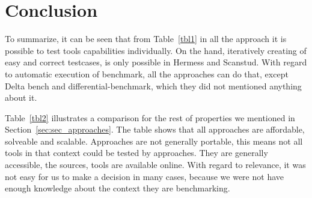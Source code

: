 \documentclass[authoryear,preprint]{sigplanconf}
\begin{document}
\section{Conclusion}
\label{sec:conclusion}
To summarize, it can be seen that from Table~\ref{tbl1} in all the approach it is possible to test tools capabilities individually. On the hand, iteratively creating of easy and correct testcases, is only possible in Hermess and Scanstud. With regard to automatic execution of benchmark, all the approaches can do that, except Delta bench and differential-benchmark, which they did not mentioned anything about it. 

Table~\ref{tbl2} illustrates a comparison for the rest of properties we mentioned in Section~\ref{sec:sec_approaches}. The table shows that all approaches are affordable, solveable and scalable. Approaches are not generally portable, this means not all tools in that context could be tested by approaches. They are generally accessible, the sources, tools are available online. With regard to relevance, it was not easy for us to make a decision in many cases, because we were not have enough knowledge about the context they are benchmarking. 
 
	
	
	
	
\end{document}
